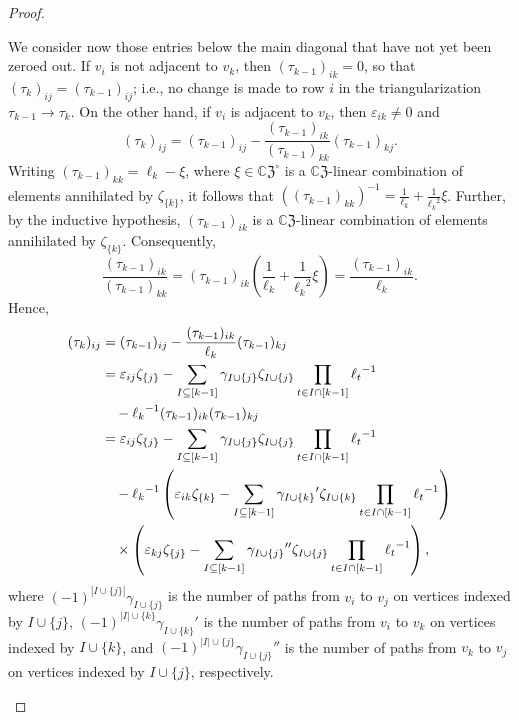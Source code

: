 \documentclass[10pt,a4paper]{amsart}
\newcommand{\CZ}{\mathbb{C}\mathfrak{Z}}
\begin{document}
\begin{proof}
\begin{description}
We consider now those entries below the main diagonal that have not yet been zeroed out.  If $v_i$ is not adjacent to $v_k$, then $(\tau_{k-1})_{ik}=0$, so that $(\tau_k)_{ij}=(\tau_{k-1})_{ij}$; i.e., no change is made to row $i$ in the triangularization $\tau_{k-1}\to\tau_k$.  On the other hand, if $v_i$ is adjacent to $v_k$, then $\varepsilon_{ik}\ne 0$ and \begin{equation}
(\tau_k)_{ij}=(\tau_{k-1})_{ij}-\frac{(\tau_{k-1})_{ik}}{(\tau_{k-1})_{kk}}(\tau_{k-1})_{kj}.
\end{equation}  
Writing $(\tau_{k-1})_{kk}=\ell_k-\xi$, where $\xi\in\CZ^\circ$ is a $\CZ$-linear combination of elements annihilated by $\zeta_{\{k\}}$, it follows that $((\tau_{k-1})_{kk})^{-1}=\frac{1}{\ell_k}+\frac{1}{{\ell_k}^2}\xi$.  
Further, by the inductive hypothesis, $(\tau_{k-1})_{ik}$ is a $\CZ$-linear combination of elements annihilated by $\zeta_{\{k\}}$. Consequently, \begin{equation*}
\frac{(\tau_{k-1})_{ik}}{(\tau_{k-1})_{kk}}=(\tau_{k-1})_{ik}\left(\frac{1}{\ell_k}+\frac{1}{{\ell_k}^2}\xi\right)=\frac{(\tau_{k-1})_{ik}}{\ell_k}.
\end{equation*}
Hence, \begin{align*}
(\tau_k)_{ij}&=(\tau_{k-1})_{ij}-\frac{(\tau_{k-1})_{ik}}{\ell_k}(\tau_{k-1})_{kj}\\
&=\varepsilon_{ij}\zeta_{\{j\}}-\sum_{I\subseteq [k-1]}\gamma_{I\cup\{j\}}\zeta_{I\cup\{j\}}\prod_{t\in I\cap[k-1]}{\ell_t}^{-1}\\
&\hskip10pt-{\ell_k}^{-1}(\tau_{k-1})_{ik}(\tau_{k-1})_{kj}\\
&=\varepsilon_{ij}\zeta_{\{j\}}-\sum_{I\subseteq [k-1]}\gamma_{I\cup\{j\}}\zeta_{I\cup\{j\}}\prod_{t\in I\cap[k-1]}{\ell_t}^{-1}\\
&\hskip10pt-{\ell_k}^{-1}\left(\varepsilon_{ik}\zeta_{\{k\}}-\sum_{I\subseteq [k-1]}{\gamma_{I\cup\{k\}}}'\zeta_{I\cup\{k\}}\prod_{t\in I\cap[k-1]}{\ell_t}^{-1}\right)\\
&\hskip10pt\times\left(\varepsilon_{kj}\zeta_{\{j\}}-\sum_{I\subseteq [k-1]}{\gamma_{I\cup\{j\}}}''\zeta_{I\cup\{j\}}\prod_{t\in I\cap[k-1]}{\ell_t}^{-1}\right),
\end{align*}
where $(-1)^{|I\cup\{j\}|}\gamma_{I\cup\{j\}}$ is the number of paths from $v_i$ to $v_j$ on vertices indexed by $I\cup\{j\}$, $(-1)^{|I|\cup\{k\}}{\gamma_{I\cup\{k\}}}'$ is the number of paths from $v_i$ to $v_k$ on vertices indexed by $I\cup\{k\}$, and $(-1)^{|I|\cup\{j\}}{\gamma_{I\cup\{j\}}}''$ is the number of paths from $v_k$ to $v_j$ on vertices indexed by $I\cup\{j\}$, respectively.


\end{description}
\end{proof}
\end{document}
